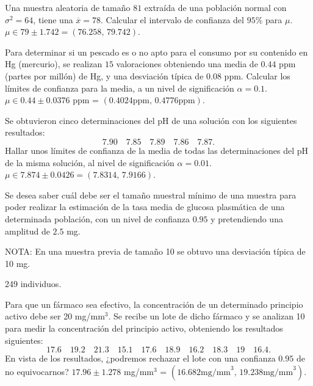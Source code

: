 
{Una muestra aleatoria de tamaño $81$ extraída de una población normal con $\sigma ^2=64$, tiene una $\overline{x}=78$.
Calcular el intervalo de confianza del $95\%$ para $\mu$.
}
{$\mu\in 79\pm 1.742 = (76.258,\,79.742)$.
}
{}


{Para determinar si un pescado es o no apto para el consumo por su contenido en Hg (mercurio), se realizan $15$
valoraciones obteniendo una media de $0.44$ ppm (partes por millón) de Hg, y una desviación típica de $0.08$ ppm.
Calcular los límites de confianza para la media, a un nivel de significación $\alpha =0.1.$ }
{
$\mu\in 0.44\pm 0.0376$ ppm = $(0.4024\text{ppm},\,0.4776\text{ppm})$.
}
{}


{Se obtuvieron cinco determinaciones del pH de una solución con los siguientes resultados: 
\[7.90\quad 7.85\quad 7.89\quad 7.86\quad 7.87.\]
Hallar unos límites de confianza de la media de todas las determinaciones del pH de la misma solución, al nivel de
significación $\alpha =0.01.$
}
{
$\mu \in 7.874\pm 0.0426 = (7.8314,\,7.9166)$.
}
{}


{Se desea saber cuál debe ser el tamaño muestral mínimo de una muestra para poder realizar la estimación de la tasa media
de glucosa plasmática de una determinada población, con un nivel de confianza $0.95$ y pretendiendo una amplitud de $2.5$
mg.

\noindent NOTA: En una muestra previa de tamaño 10 se obtuvo una desviación típica de 10 mg.
}
{
249 individuos.
}
{}


{Para que un fármaco sea efectivo, la concentración de un determinado principio activo debe ser 20 mg/mm$^3$.
Se recibe un lote de dicho fármaco y se analizan 10 para medir la concentración del principio activo, obteniendo los
resultados siguientes:
\[
17.6 \quad 19.2 \quad 21.3 \quad 15.1 \quad 17.6 \quad 18.9 \quad 16.2 \quad 18.3 \quad 19 \quad 16.4.
\]
En vista de los resultados, ¿podremos rechazar el lote con una confianza $0.95$ de no equivocarnos?
}
{
$17.96\pm 1.278$ mg/mm$^3$ = $(16.682\text{mg/mm}^3,\,19.238\text{mg/mm}^3)$.
}
{}


